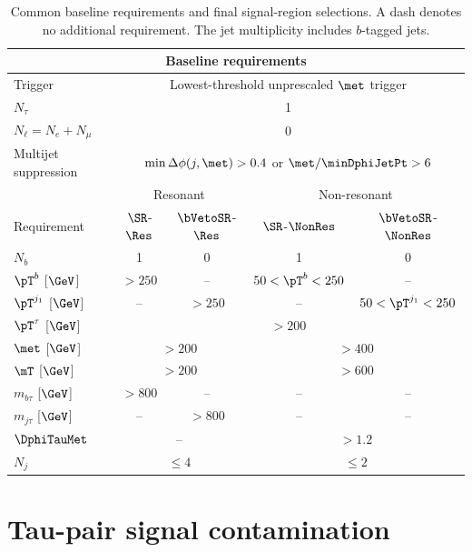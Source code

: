 \begin{table}[htbp]
    \centering
    \small
    \caption{Common baseline requirements and final signal-region selections. A dash denotes no additional requirement. The jet multiplicity includes $b$-tagged jets.}
    \label{tab:ch7_signal_regions}
    \begin{tabular}{lcccc}
        \toprule
        \multicolumn{5}{c}{Baseline requirements} \\
        \midrule
        Trigger & \multicolumn{4}{c}{Lowest-threshold unprescaled $\met$ trigger} \\
        $N_\tau$ & \multicolumn{4}{c}{1} \\
        $N_\ell=N_e+N_\mu$ & \multicolumn{4}{c}{0} \\
        Multijet suppression & \multicolumn{4}{c}{$\min\Delta\phi(j,\met)>0.4$ or $\met/\minDphiJetPt>6$} \\
        \midrule
        & \multicolumn{2}{c}{Resonant} & \multicolumn{2}{c}{Non-resonant} \\
        Requirement & $\SR$-$\Res$ & $\bVetoSR$-$\Res$ & $\SR$-$\NonRes$ & $\bVetoSR$-$\NonRes$ \\
        \midrule
        $N_b$ & 1 & 0 & 1 & 0 \\
        $\pT^b$ [$\GeV$] & $>250$ & -- & $50<\pT^b<250$ & -- \\
        $\pT^{j_1}$ [$\GeV$] & -- & $>250$ & -- & $50<\pT^{j_1}<250$ \\
        $\pT^\tau$ [$\GeV$] & \multicolumn{4}{c}{$>200$} \\
        $\met$ [$\GeV$] & \multicolumn{2}{c}{$>200$} & \multicolumn{2}{c}{$>400$} \\
        $\mT$ [$\GeV$] & \multicolumn{2}{c}{$>200$} & \multicolumn{2}{c}{$>600$} \\
        $m_{b\tau}$ [$\GeV$] & $>800$ & -- & -- & -- \\
        $m_{j\tau}$ [$\GeV$] & -- & $>800$ & -- & -- \\
        $\DphiTauMet$ & \multicolumn{2}{c}{--} & \multicolumn{2}{c}{$>1.2$} \\
        $N_j$ & \multicolumn{2}{c}{$\leq4$} & \multicolumn{2}{c}{$\leq2$} \\
        \bottomrule
    \end{tabular}
\end{table}

\clearpage
\section{Tau-pair signal contamination}
\label{sec:ch7_tautau_contamination}

